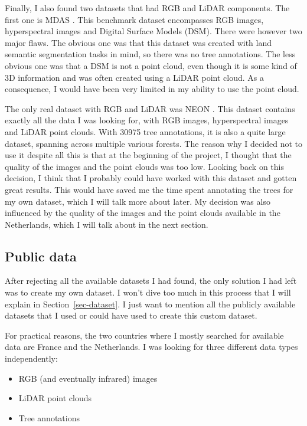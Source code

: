\documentclass[
]{report}
\providecommand{\tightlist}{%
  \setlength{\itemsep}{0pt}\setlength{\parskip}{0pt}}\usepackage{longtable,booktabs,array}
\begin{document}
Finally, I also found two datasets that had RGB and LiDAR components.
The first one is MDAS \autocite{MDAS}. This benchmark dataset
encompasses RGB images, hyperspectral images and Digital Surface Models
(DSM). There were however two major flaws. The obvious one was that this
dataset was created with land semantic segmentation tasks in mind, so
there was no tree annotations. The less obvious one was that a DSM is
not a point cloud, even though it is some kind of 3D information and was
often created using a LiDAR point cloud. As a consequence, I would have
been very limited in my ability to use the point cloud.

The only real dataset with RGB and LiDAR was NEON \autocite{NEON}. This
dataset contains exactly all the data I was looking for, with RGB
images, hyperspectral images and LiDAR point clouds. With 30975 tree
annotations, it is also a quite large dataset, spanning across multiple
various forests. The reason why I decided not to use it despite all this
is that at the beginning of the project, I thought that the quality of
the images and the point clouds was too low. Looking back on this
decision, I think that I probably could have worked with this dataset
and gotten great results. This would have saved me the time spent
annotating the trees for my own dataset, which I will talk more about
later. My decision was also influenced by the quality of the images and
the point clouds available in the Netherlands, which I will talk about
in the next section.

\subsection{Public data}\label{public-data}

After rejecting all the available datasets I had found, the only
solution I had left was to create my own dataset. I won't dive too much
in this process that I will explain in Section~\ref{sec-dataset}. I just
want to mention all the publicly available datasets that I used or could
have used to create this custom dataset.

For practical reasons, the two countries where I mostly searched for
available data are France and the Netherlands. I was looking for three
different data types independently:

\begin{itemize}
\tightlist
\item
  RGB (and eventually infrared) images
\item
  LiDAR point clouds
\item
  Tree annotations
\end{itemize}
\end{document}
